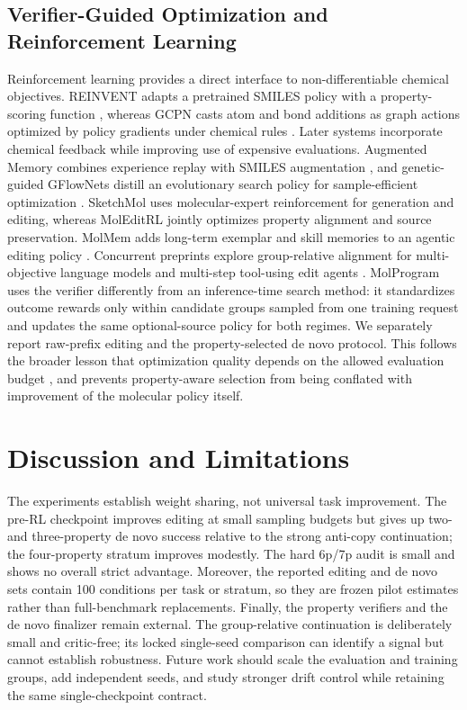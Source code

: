 \documentclass{article}
\begin{document}
\subsection{Verifier-Guided Optimization and Reinforcement Learning}
Reinforcement learning provides a direct interface to non-differentiable
chemical objectives. REINVENT adapts a pretrained SMILES policy with a
property-scoring function \citep{olivecrona2017reinvent}, whereas GCPN casts
atom and bond additions as graph actions optimized by policy gradients under
chemical rules \citep{you2018gcpn}. Later systems incorporate chemical
feedback while improving use of expensive evaluations. Augmented Memory
combines experience replay with SMILES augmentation
\citep{guo2024augmentedmemory}, and genetic-guided GFlowNets distill an
evolutionary search policy for sample-efficient optimization
\citep{kim2024geneticgflownets}. SketchMol uses molecular-expert reinforcement
for generation and editing, whereas MolEditRL jointly optimizes property
alignment and source preservation. MolMem adds long-term exemplar and skill
memories to an agentic editing policy \citep{wang2026molmem}. Concurrent
preprints explore group-relative alignment for multi-objective language models
and multi-step tool-using edit agents \citep{gao2026cmoral,yang2025molact}.
MolProgram uses the verifier differently from an inference-time search method:
it standardizes outcome rewards only within candidate groups sampled from one
training request and updates the same optional-source policy for both regimes.
We separately report raw-prefix editing and the property-selected de novo
protocol. This follows the broader lesson that optimization quality depends on
the allowed evaluation budget \citep{gao2022sampleefficiency}, and prevents
property-aware selection from being conflated with improvement of the molecular
policy itself.





\section{Discussion and Limitations}
The experiments establish weight sharing, not universal task improvement. The
pre-RL checkpoint improves editing at small sampling budgets but gives up
two- and three-property de novo success relative to the strong anti-copy
continuation; the four-property stratum improves modestly. The hard 6p/7p
audit is small and shows no overall strict advantage. Moreover, the reported
editing and de novo sets contain 100 conditions per task or stratum, so they
are frozen pilot estimates rather than full-benchmark replacements. Finally,
the property verifiers and the de novo finalizer remain external. The
group-relative continuation is deliberately small and critic-free; its locked
single-seed comparison can identify a signal but cannot establish robustness.
Future work should scale the evaluation and training groups, add independent
seeds, and study stronger drift control while retaining the same
single-checkpoint contract.
\end{document}
